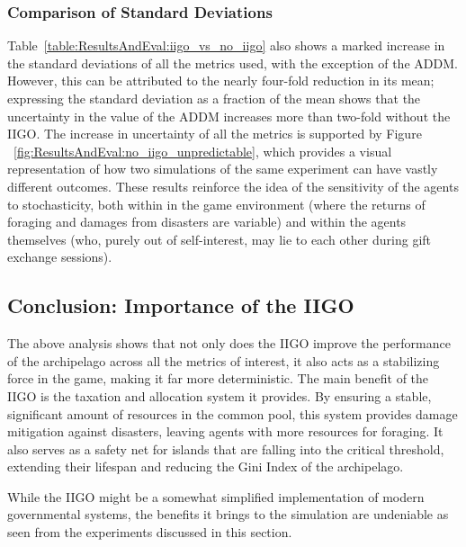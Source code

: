 \subsubsection{Comparison of Standard Deviations}
\label{subsec:ResultsAndEval:no-iigo:comparison_of_std_devs}
Table~\ref{table:ResultsAndEval:iigo_vs_no_iigo} also shows a marked increase in the standard deviations of all the metrics used, with the exception of the ADDM. However, this can be attributed to the nearly four-fold reduction in its mean; expressing the standard deviation as a fraction of the mean shows that the uncertainty in the value of the ADDM increases more than two-fold without the IIGO.
The increase in uncertainty of all the metrics is supported by Figure ~\ref{fig:ResultsAndEval:no_iigo_unpredictable}, which provides a visual representation of how two simulations of the same experiment can have vastly different outcomes. 
These results reinforce the idea of the sensitivity of the agents to stochasticity, both within in the game environment (where the returns of foraging and damages from disasters are variable) and within the agents themselves (who, purely out of self-interest, may lie to each other during gift exchange sessions).


\subsection{Conclusion: Importance of the IIGO}
\label{subsec:Simulations:no-iigo:conclusion}

The above analysis shows that not only does the IIGO improve the performance of the archipelago across all the metrics of interest, it also acts as a stabilizing force in the game, making it far more deterministic. 
The main benefit of the IIGO is the taxation and allocation system it provides. By ensuring a stable, significant amount of resources in the common pool, this system provides damage mitigation against disasters, leaving agents with more resources for foraging. 
It also serves as a safety net for islands that are falling into the critical threshold, extending their lifespan and reducing the Gini Index of the archipelago.

While the IIGO might be a somewhat simplified implementation of modern governmental systems, the benefits it brings to the simulation are undeniable as seen from the experiments discussed in this section.

